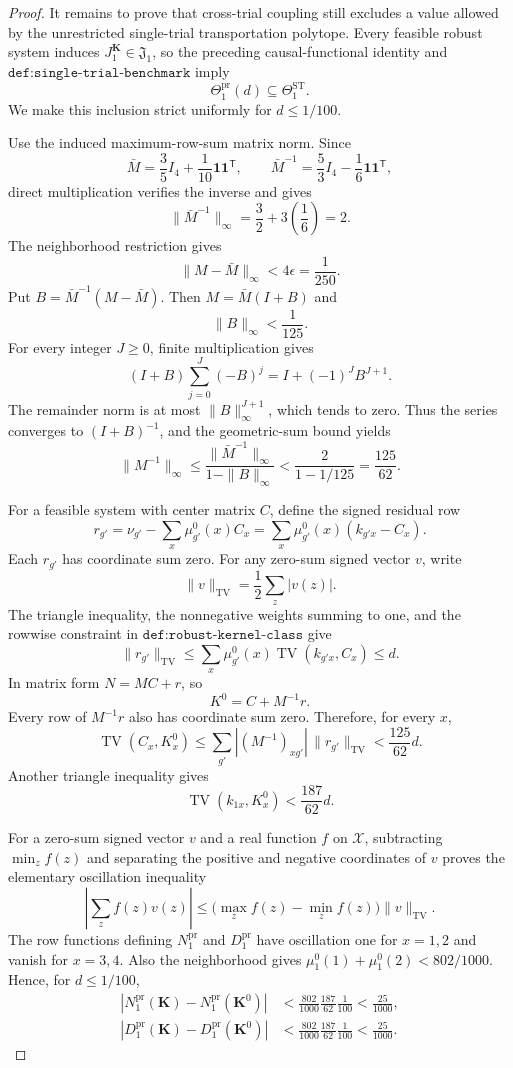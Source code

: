 \documentclass{article}
\begin{document}
\begin{proof}
It remains to prove that cross-trial coupling still excludes a value allowed by the unrestricted single-trial transportation polytope. Every feasible robust system induces \(J_1^{\mathbf K}\in\mathfrak J_1\), so the preceding causal-functional identity and \(\texttt{def:single-trial-benchmark}\) imply
\[
 \Theta_1^{\mathrm{pr}}(d)\subseteq\Theta_1^{\mathrm{ST}}.
\]
We make this inclusion strict uniformly for \(d\le1/100\).

Use the induced maximum-row-sum matrix norm. Since
\[
 \bar M=\frac35 I_4+\frac1{10}\mathbf 1\mathbf 1^{\mathsf T},
 \qquad
 \bar M^{-1}=\frac53I_4-\frac16\mathbf 1\mathbf 1^{\mathsf T},
\]
direct multiplication verifies the inverse and gives
\[
 \|\bar M^{-1}\|_\infty=\frac32+3\left(\frac16\right)=2.
\]
The neighborhood restriction gives
\[
 \|M-\bar M\|_\infty<4\epsilon=\frac1{250}.
\]
Put \(B=\bar M^{-1}(M-\bar M)\). Then \(M=\bar M(I+B)\) and
\[
 \|B\|_\infty<\frac1{125}.
\]
For every integer \(J\ge0\), finite multiplication gives
\[
 (I+B)\sum_{j=0}^{J}(-B)^j=I+(-1)^JB^{J+1}.
\]
The remainder norm is at most \(\|B\|_\infty^{J+1}\), which tends to zero. Thus the series converges to \((I+B)^{-1}\), and the geometric-sum bound yields
\[
 \|M^{-1}\|_\infty
 \le \frac{\|\bar M^{-1}\|_\infty}{1-\|B\|_\infty}
 <\frac{2}{1-1/125}=\frac{125}{62}.
\]

For a feasible system with center matrix \(C\), define the signed residual row
\[
 r_{g'}=\nu_{g'}-\sum_x\mu_{g'}^0(x)C_x
 =\sum_x\mu_{g'}^0(x)(k_{g'x}-C_x).
\]
Each \(r_{g'}\) has coordinate sum zero. For any zero-sum signed vector \(v\), write
\[
 \|v\|_{\mathrm{TV}}=\frac12\sum_z|v(z)|.
\]
The triangle inequality, the nonnegative weights summing to one, and the rowwise constraint in \(\texttt{def:robust-kernel-class}\) give
\[
 \|r_{g'}\|_{\mathrm{TV}}
 \le\sum_x\mu_{g'}^0(x)\operatorname{TV}(k_{g'x},C_x)
 \le d.
\]
In matrix form \(N=MC+r\), so
\[
 K^0=C+M^{-1}r.
\]
Every row of \(M^{-1}r\) also has coordinate sum zero. Therefore, for every \(x\),
\[
 \operatorname{TV}(C_x,K_x^0)
 \le\sum_{g'}|(M^{-1})_{xg'}|\,\|r_{g'}\|_{\mathrm{TV}}
 <\frac{125}{62}d.
\]
Another triangle inequality gives
\[
 \operatorname{TV}(k_{1x},K_x^0)<\frac{187}{62}d.
\]

For a zero-sum signed vector \(v\) and a real function \(f\) on \(\mathcal X\), subtracting \(\min_z f(z)\) and separating the positive and negative coordinates of \(v\) proves the elementary oscillation inequality
\[
 \left|\sum_zf(z)v(z)\right|
 \le\bigl(\max_zf(z)-\min_zf(z)\bigr)\|v\|_{\mathrm{TV}}.
\]
The row functions defining \(N_1^{\mathrm{pr}}\) and \(D_1^{\mathrm{pr}}\) have oscillation one for \(x=1,2\) and vanish for \(x=3,4\). Also the neighborhood gives \(\mu_1^0(1)+\mu_1^0(2)<802/1000\). Hence, for \(d\le1/100\),
\[
 \begin{split}
 |N_1^{\mathrm{pr}}(\mathbf K)-N_1^{\mathrm{pr}}(\mathbf K^0)|
 &<\frac{802}{1000}\frac{187}{62}\frac1{100}<\frac{25}{1000},\\
 |D_1^{\mathrm{pr}}(\mathbf K)-D_1^{\mathrm{pr}}(\mathbf K^0)|
 &<\frac{802}{1000}\frac{187}{62}\frac1{100}<\frac{25}{1000}.
 \end{split}
\]


\end{proof}
\end{document}
